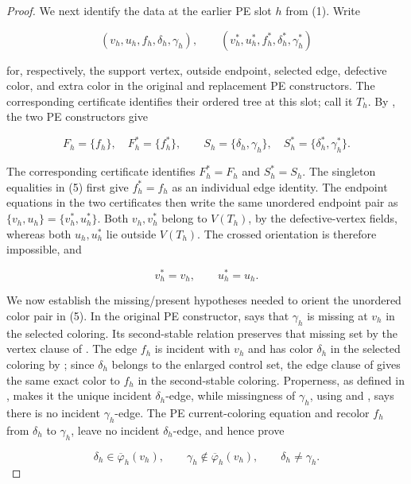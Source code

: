 \begin{proof}
We next identify the data at the earlier PE slot \(h\) from (1).  Write

\[
 (v_h,u_h,f_h,\delta_h,\gamma_h),\qquad
 (v_h^*,u_h^*,f_h^*,\delta_h^*,\gamma_h^*)                 \tag{4}
\]

for, respectively, the support vertex, outside endpoint, selected edge,
defective color, and extra color in the original and replacement PE
constructors.  The corresponding certificate identifies their ordered
tree at this slot; call it \(T_h\).  By
, the two PE constructors give

\[
 F_h=\{f_h\},\quad F_h^*=\{f_h^*\},\qquad
 S_h=\{\delta_h,\gamma_h\},\quad
 S_h^*=\{\delta_h^*,\gamma_h^*\}.                           \tag{5}
\]

The corresponding certificate identifies \(F_h^*=F_h\) and
\(S_h^*=S_h\).  The singleton equalities in (5) first give
\(f_h^*=f_h\) as an individual edge identity.  The endpoint equations in
the two  certificates then write the
same unordered endpoint pair as
\(\{v_h,u_h\}=\{v_h^*,u_h^*\}\).  Both \(v_h,v_h^*\) belong to
\(V(T_h)\), by the defective-vertex fields, whereas both
\(u_h,u_h^*\) lie outside \(V(T_h)\).  The crossed orientation is
therefore impossible, and

\[
                  v_h^*=v_h,\qquad u_h^*=u_h.                \tag{6}
\]

We now establish the missing/present hypotheses needed to orient the
unordered color pair in (5).  In the original PE constructor,
 says that \(\gamma_h\) is missing at
\(v_h\) in the selected coloring.  Its second-stable relation preserves
that missing set by the vertex clause of .  The
edge \(f_h\) is incident with \(v_h\) and has color \(\delta_h\) in the
selected coloring by ; since
\(\delta_h\) belongs to the enlarged control set, the edge clause of
 gives the same exact color to \(f_h\) in the
second-stable coloring.  Properness, as defined in
, makes it the unique incident
\(\delta_h\)-edge, while missingness of \(\gamma_h\), using
 and , says there is no
incident \(\gamma_h\)-edge.  The PE current-coloring equation and
 recolor \(f_h\) from \(\delta_h\) to
\(\gamma_h\), leave no incident \(\delta_h\)-edge, and hence prove

\[
 \delta_h\in\overline\varphi_h(v_h),\qquad
 \gamma_h\notin\overline\varphi_h(v_h),\qquad
 \delta_h\ne\gamma_h.                                      \tag{7}
\]


\end{proof}
